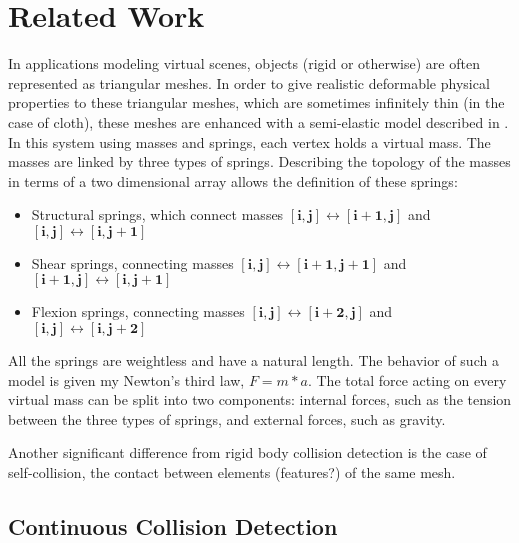 \chapter{Related Work}
\label{chapter:sota}


In applications modeling virtual scenes, objects (rigid or otherwise) are often represented as triangular meshes. In order to give realistic deformable physical properties to these triangular meshes, which are sometimes infinitely thin (in the case of cloth), these meshes are enhanced with a semi-elastic model described in \citep{provot95}. In this system using masses and springs, each vertex holds a virtual mass. The masses are linked by three types of springs. Describing the topology of the masses in terms of a two dimensional array allows the definition of these springs:

\begin{itemize}
	\item Structural springs, which connect masses $\mathbf{[i, j] \leftrightarrow [i + 1, j]}$ and $\mathbf{[i, j] \leftrightarrow [i,j + 1]}$
	\item Shear springs, connecting masses $\mathbf{[i, j] \leftrightarrow [i + 1, j + 1]}$ and $\mathbf{[i + 1, j] \leftrightarrow [i, j + 1]}$
	\item Flexion springs, connecting masses $\mathbf{[i, j] \leftrightarrow [i + 2, j]}$ and $\mathbf{[i, j] \leftrightarrow [i, j + 2]}$
\end{itemize}
All the springs are weightless and have a natural length. The behavior of such a model is given my Newton's third law, $F = m * a$. The total force acting on every virtual mass can be split into two components: internal forces, such as the tension between the three types of springs, and external forces, such as gravity.

Another significant difference from rigid body collision detection is the case of self-collision, the contact between elements (features?) of the same mesh. 



\section{Continuous Collision Detection}
\label{sec:ccd}

